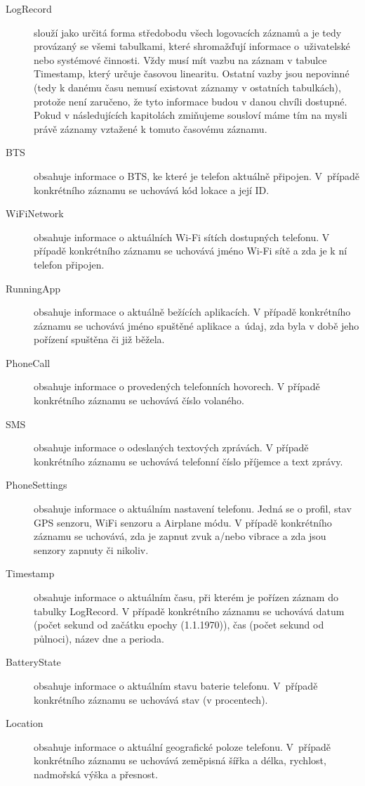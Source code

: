 \documentclass[thesis=M,czech]{FITthesis}[2012/06/26]
\begin{document}
\begin{description}
\item[LogRecord]
slouží jako určitá forma středobodu všech logovacích záznamů a je tedy provázaný se všemi tabulkami, které shromažďují informace o~uživatelské nebo systémové činnosti. Vždy musí mít vazbu na záznam v tabulce Timestamp, který určuje časovou linearitu. Ostatní vazby jsou nepovinné (tedy k danému času nemusí existovat záznamy v ostatních tabulkách), protože není zaručeno, že tyto informace budou v danou chvíli dostupné. Pokud v následujících kapitolách zmiňujeme sousloví  máme tím na mysli právě záznamy vztažené k tomuto časovému záznamu.

\item[BTS]
obsahuje informace o BTS, ke které je telefon aktuálně připojen. V~případě konkrétního záznamu se uchovává kód lokace a její ID.

\item[WiFiNetwork]
obsahuje informace o aktuálních Wi-Fi sítích dostupných telefonu. V případě konkrétního záznamu se uchovává jméno Wi-Fi sítě a zda je k ní telefon připojen.

\item[RunningApp]
obsahuje informace o aktuálně bežících aplikacích. V případě konkrétního záznamu se uchovává jméno spuštěné aplikace a~údaj, zda byla v době jeho pořízení spuštěna či již běžela.

\item[PhoneCall]
obsahuje informace o provedených telefonních hovorech. V případě konkrétního záznamu se uchovává číslo volaného.

\item[SMS]
obsahuje informace o odeslaných textových zprávách. V případě konkrétního záznamu se uchovává telefonní číslo příjemce a text zprávy.

\item[PhoneSettings]
obsahuje informace o aktuálním nastavení telefonu. Jedná se o profil, stav GPS senzoru, WiFi senzoru a Airplane módu. V případě konkrétního záznamu se uchovává, zda je zapnut zvuk a/nebo vibrace a zda jsou senzory zapnuty či nikoliv.

\item[Timestamp]
obsahuje informace o aktuálním času, při kterém je pořízen záznam do tabulky LogRecord. V případě konkrétního záznamu se uchovává datum (počet sekund od začátku epochy (1.1.1970)), čas (počet sekund od půlnoci), název dne a perioda.

\item[BatteryState]
obsahuje informace o aktuálním stavu baterie telefonu. V~případě konkrétního záznamu se uchovává stav (v procentech).

\item[Location]
obsahuje informace o aktuální geografické poloze telefonu. V~případě konkrétního záznamu se uchovává zeměpisná šířka a délka, rychlost, nadmořská výška a přesnost.
\end{description}
\end{document}

